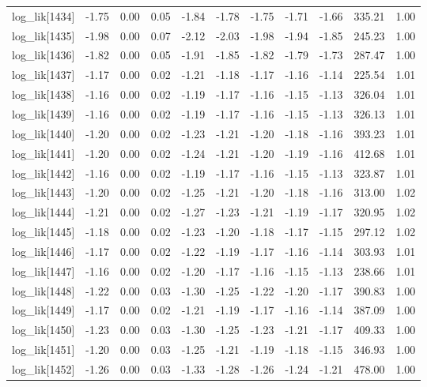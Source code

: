 \begin{table}[ht]
\begin{tabular}{rrrrrrrrrrr}
  log\_lik[1434] & -1.75 & 0.00 & 0.05 & -1.84 & -1.78 & -1.75 & -1.71 & -1.66 & 335.21 & 1.00 \\ 
  log\_lik[1435] & -1.98 & 0.00 & 0.07 & -2.12 & -2.03 & -1.98 & -1.94 & -1.85 & 245.23 & 1.00 \\ 
  log\_lik[1436] & -1.82 & 0.00 & 0.05 & -1.91 & -1.85 & -1.82 & -1.79 & -1.73 & 287.47 & 1.00 \\ 
  log\_lik[1437] & -1.17 & 0.00 & 0.02 & -1.21 & -1.18 & -1.17 & -1.16 & -1.14 & 225.54 & 1.01 \\ 
  log\_lik[1438] & -1.16 & 0.00 & 0.02 & -1.19 & -1.17 & -1.16 & -1.15 & -1.13 & 326.04 & 1.01 \\ 
  log\_lik[1439] & -1.16 & 0.00 & 0.02 & -1.19 & -1.17 & -1.16 & -1.15 & -1.13 & 326.13 & 1.01 \\ 
  log\_lik[1440] & -1.20 & 0.00 & 0.02 & -1.23 & -1.21 & -1.20 & -1.18 & -1.16 & 393.23 & 1.01 \\ 
  log\_lik[1441] & -1.20 & 0.00 & 0.02 & -1.24 & -1.21 & -1.20 & -1.19 & -1.16 & 412.68 & 1.01 \\ 
  log\_lik[1442] & -1.16 & 0.00 & 0.02 & -1.19 & -1.17 & -1.16 & -1.15 & -1.13 & 323.87 & 1.01 \\ 
  log\_lik[1443] & -1.20 & 0.00 & 0.02 & -1.25 & -1.21 & -1.20 & -1.18 & -1.16 & 313.00 & 1.02 \\ 
  log\_lik[1444] & -1.21 & 0.00 & 0.02 & -1.27 & -1.23 & -1.21 & -1.19 & -1.17 & 320.95 & 1.02 \\ 
  log\_lik[1445] & -1.18 & 0.00 & 0.02 & -1.23 & -1.20 & -1.18 & -1.17 & -1.15 & 297.12 & 1.02 \\ 
  log\_lik[1446] & -1.17 & 0.00 & 0.02 & -1.22 & -1.19 & -1.17 & -1.16 & -1.14 & 303.93 & 1.01 \\ 
  log\_lik[1447] & -1.16 & 0.00 & 0.02 & -1.20 & -1.17 & -1.16 & -1.15 & -1.13 & 238.66 & 1.01 \\ 
  log\_lik[1448] & -1.22 & 0.00 & 0.03 & -1.30 & -1.25 & -1.22 & -1.20 & -1.17 & 390.83 & 1.00 \\ 
  log\_lik[1449] & -1.17 & 0.00 & 0.02 & -1.21 & -1.19 & -1.17 & -1.16 & -1.14 & 387.09 & 1.00 \\ 
  log\_lik[1450] & -1.23 & 0.00 & 0.03 & -1.30 & -1.25 & -1.23 & -1.21 & -1.17 & 409.33 & 1.00 \\ 
  log\_lik[1451] & -1.20 & 0.00 & 0.03 & -1.25 & -1.21 & -1.19 & -1.18 & -1.15 & 346.93 & 1.00 \\ 
  log\_lik[1452] & -1.26 & 0.00 & 0.03 & -1.33 & -1.28 & -1.26 & -1.24 & -1.21 & 478.00 & 1.00 \\ 

\end{tabular}
\end{table}
